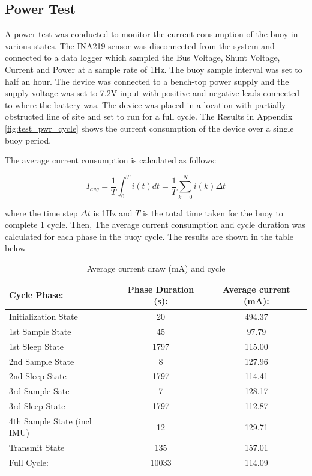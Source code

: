 \begin{table}[H]
\begin{tabular}{|m{}|m{}|}
	\end{tabular} 
	\label{tab:test_Systemtest_descrip}
\end{table}

\subsection{Power Test}

A power test was conducted to monitor the current consumption of the buoy in various states. The INA219 sensor was disconnected from the system and connected to a data logger which sampled the Bus Voltage, Shunt Voltage, Current and Power at a sample rate of 1Hz. The buoy sample interval was set to half an hour. The device was connected to a bench-top power supply and the supply voltage was set to 7.2V input with positive and negative leads connected to where the battery was. The device was placed in a location with partially-obstructed line of site and set to run for a full cycle. The Results in Appendix \ref{fig:test_pwr_cycle} shows the current consumption of the device over a single buoy period.


The average current consumption is calculated as follows:

\begin{equation}
    I_{avg} = \frac{1}{T}\int_{0}^{T}i(t)dt = \frac{1}{T}\sum_{k=0}^{N}i(k)\Delta t
\end{equation}

where the time step $\Delta t$ is 1Hz and $T $ is the total time taken for the buoy to complete 1 cycle. Then, The average current consumption and cycle duration was calculated for each phase in the buoy cycle. The results are shown in the table below

\begin{table}[H]
    \centering
    \begin{tabular}{|l|c|c|}
    \hline
    \textbf{Cycle Phase: } & \textbf{Phase Duration (s):} & \textbf{Average current (mA):}\\
    \hline
     Initialization State & 20 & 494.37 \\
     \hline
     1st Sample State & 45 & 97.79 \\
     \hline 
     1st Sleep State & 1797 & 115.00 \\
     \hline
     2nd Sample State & 8 & 127.96\\
     \hline
     2nd Sleep State & 1797 & 114.41\\
     \hline
     3rd Sample Sate & 7 & 128.17\\
     \hline
     3rd Sleep State & 1797 & 112.87\\
     \hline
     4th Sample State (incl IMU) & 12  &129.71 \\
     \hline
     Transmit State & 135 & 157.01 \\
     \hline
     \hline
     Full Cycle:    & 10033 & 114.09 \\
     \hline
     \hline
    \end{tabular}
    \caption{Average current draw (mA) and cycle}
    \label{tab:test_powtest_data}
\end{table}



